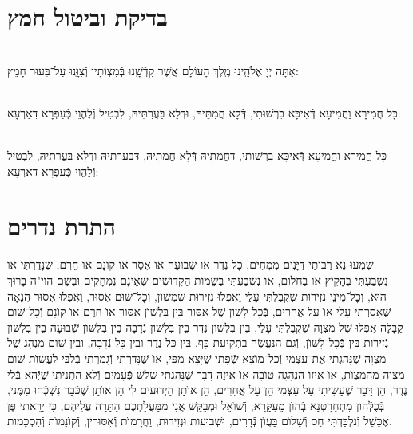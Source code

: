 \documentclass[twoside, openany, parskip=half, 11pt]{book}
\begin{document}
\begin{sometimes}
\chapter[בדיקת וביטול חמץ]{ בדיקת וביטול חמץ }

\\
אַתָּה יְיָ אֱלֹהֵֽינוּ מֶֽלֶךְ הָעוֹלָם אֲשֶׁר קִדְּֿשָֽׁנוּ בְּֿמִצְוֹתָיו וְֿצִוָּֽנוּ עַל־בִּעוּר חָמֵץ:


\\
כָּל חֲמִירָא וַחֲמִיעָא דְּֿאִיכָּא בִרְשׁוּתִי, דְּֿלָא חֲמִתֵּיהּ, וּדְלָא בַּעֲרִתֵּיהּ, לִבְטִיל וְֿלֶהֱוֵי כְּֿעַפְרָא דִאַרְעָא:


\\
כָּל חֲמִירָא וַחֲמִיעָא דְּֿאִיכָּא בִרְשׁוּתִי, דַּחֲמִתֵּיהּ דְּֿלָא חֲמִתֵּיהּ, דּבַעַרִתֵּיהּ וּדְלָא בַּעֲרִתֵּיהּ, לִבְטִיל וְֿלֶהֱוֵי כְּֿעַפְרָא דִאַרְעָא:



\chapter[התרת נדרים]{ התרת נדרים }


שִׁמְעוּ נָא רַבּוׂתַי דַּיָּנִים מֻמְחִים, כָּל נֶדֶר אוׂ שְֿׁבוּעָה אוׂ אִסָּר אוׂ קוׂנָם אוׂ חֵרֶם, שֶׁנָּדַרְתִּי אוׂ נִשְׁבַּעְתִּי בְּֿהָקִיץ אוׂ בַחֲלוׂם, אוׂ נִשְׁבַּעְתִּי בַּשֵּׁמוׂת הַקְּֿדוׂשִׁים שֶׁאֵינָם נִמְחָקִים וּבְשֵׁם הוי"ה בָּרוּךְ הוּא, וְֿכׇל־מִינֵי נְֿזִירוּת שֶׁקִּבַּלְתִּי עָלַי וַאֲפִלּוּ נְֿזִירוּת שִׁמְשׁוׂן, וְֿכׇל־שׁוּם אִסּוּר, וַאֲפִלּוּ אִסּוּר הֲנָאָה שֶׁאָסַרְתִּי עָלַי אוׂ עַל אֲחֵרִים, בְּֿכׇל־לָשׁוׂן שֶׁל אִסּוּר בֵּין בִּלְשׁוׂן אִסּוּר אוׂ חֵרֶם אוׂ קוׂנָם וְֿכׇל־שׁוּם קַבָּלָה אֲפִלּוּ שֶׁל מִצְוָה שֶׁקִּבַּלְתִּי עָלַי, בֵּין בִּלְשׁון נֶדֶר בֵּין בִּלְשׁון נְֿדָבָה בֵּין בִּלְשׁוׂן שְֿׁבוּעָה בֵּין בִּלְשׁוׂן נְֿזִירוּת בֵּין בְּֿכׇל־לָשׁוׂן, וְֿגַם הַנַּעֲשֶׂה בִּתְקִיעַת כָּף. בֵּין כָּל נֶדֶר וּבֵין כָּל נְֿדָבָה, וּבֵין שׁוּם מִנְהָג שֶׁל מִצְוָה שֶׁנָּהַגְתִּי אֶת־עַצְמִי וְֿכׇל־מוׂצָא שְֿׂפָתַי שֶׁיָּצָא מִפִּי, אוׂ שֶׁנָּדַרְתִּי וְֿגָמַרְתִּי בְֿלִבִּי לַעֲשוׂת שׁוּם מִצְוָה מֵהַמִּצְוׂת, אוׂ אֵיזוׂ הַנְהָגָה טוׂבָה אוׂ אֵיזֶה דָבָר שֶׁנָּהַגְתִּי שָׁלשׁ פְּֿעָמִים וְֿלא הִתְנֵיתִי שֶׁיְּֿהֵא בְּֿלִי נֶדֶר, הֵן דָּבָר שֶׁעָשִׂיתִי עַל עַצְמִי הֵן עַל אֲחֵרִים, הֵן אוׂתָן הַיְדוּעִים לִי הֵן אוׂתָן שֶׁכְּֿבָר נִשְׁכְּֿחוּ מִמֶּנּי, בְּֿכֻלְּֿהוׂן מִתְחָרַטְנָא בְֿהוׂן מֵעִקָּרָא, וְֿשׁוׂאֵל וּמְבַקֵּשׁ אֲנִי מִמַּעֲלַתְכֶם הַתָּרָה עֲלֵיהֶם, כִּי יָרֵאתִי פֶּן אֶכָּשֵׁל וְֿנִלְכַּדְתִּי חַס וְֿשָׁלוׂם בַּעֲוׂן נְֿדָרִים, וּשְׁבוּעות וּנְזִירוּת, וַחֲרָמוׂת וְֿאִסּוּרִין, וְֿקוׂנָמוׂת וְֿהַסְכָּמוׂת.


\end{sometimes}
\end{document}
